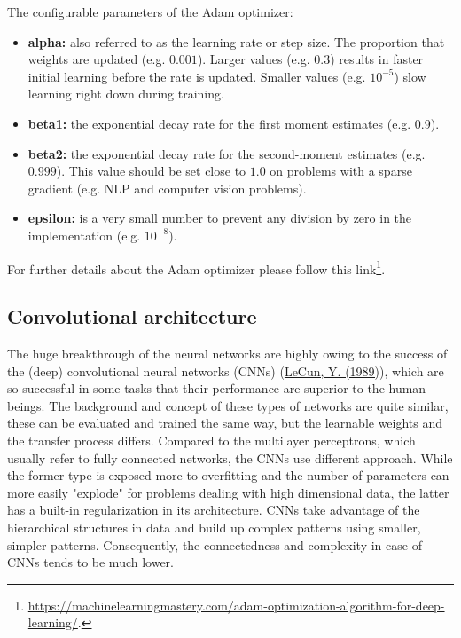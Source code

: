 \documentclass[12pt]{article}
\theoremstyle{plain}
\begin{document}
The configurable parameters of the Adam optimizer:

\begin{itemize}
	\item \textbf{alpha:} also referred to as the learning rate or step size. The proportion that weights are updated (e.g. $0.001$). Larger values (e.g. $0.3$) results in faster initial learning before the rate is updated. Smaller values (e.g. $10^{-5}$) slow learning right down during training.
	\item \textbf{beta1:} the exponential decay rate for the first moment estimates (e.g. $0.9$).
	\item \textbf{beta2:} the exponential decay rate for the second-moment estimates (e.g. $0.999$). This value should be set close to $1.0$ on problems with a sparse gradient (e.g. NLP and computer vision problems).
	\item \textbf{epsilon:} is a very small number to prevent any division by zero in the implementation (e.g. $10^{-8}$).
\end{itemize}

For further details about the Adam optimizer please follow this link\footnote{\url{https://machinelearningmastery.com/adam-optimization-algorithm-for-deep-learning/}.}.

\subsection{Convolutional architecture}


The huge breakthrough of the neural networks are highly owing to the success of the (deep) convolutional neural networks (CNNs) (\hyperlink{Deeplea_LeCun_1}{LeCun, Y. (1989)}), which are so successful in some tasks that their performance are superior to the human beings. The background and concept of these types of networks are quite similar, these can be evaluated and trained the same way, but the learnable weights and the transfer process differs. Compared to the multilayer perceptrons, which usually refer to fully connected networks, the CNNs use different approach. While the former type is exposed more to overfitting and the number of parameters can more easily "explode" for problems dealing with high dimensional data, the latter has a built-in regularization in its architecture. CNNs take advantage of the hierarchical structures in data and build up complex patterns using smaller, simpler patterns. Consequently, the connectedness and complexity in case of CNNs tends to be much lower.
\end{document}
